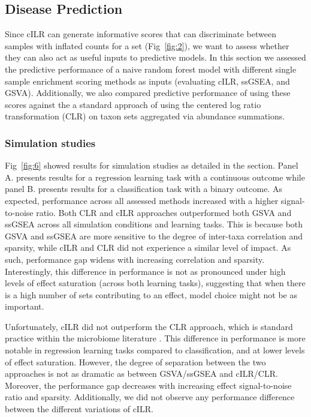 \documentclass[10pt,letterpaper]{article}
\begin{document}
\subsection*{Disease Prediction}   
Since cILR can generate informative scores that can discriminate between samples with inflated counts for a set (Fig~\ref{fig:2}), we want to assess whether they can also act as useful inputs to predictive models. In this section we assessed the predictive performance of a naive random forest model \cite{breiman2001} with different single sample enrichment scoring methods as inputs (evaluating cILR, ssGSEA, and GSVA). Additionally, we also compared predictive performance of using these scores against the a standard approach of using the centered log ratio transformation (CLR) on taxon sets aggregated via abundance summations.     

\subsubsection*{Simulation studies}
Fig~\ref{fig:6} showed results for simulation studies as detailed in the  section. Panel A. presents results for a regression learning task with a continuous outcome while panel B. presents results for a classification task with a binary outcome. As expected, performance across all assessed methods increased with a higher signal-to-noise ratio. Both CLR and cILR approaches outperformed both GSVA and ssGSEA across all simulation conditions and learning tasks. This is because both GSVA and ssGSEA are more sensitive to the degree of inter-taxa correlation and sparsity, while cILR and CLR did not experience a similar level of impact. As such, performance gap widens with increasing correlation and sparsity. Interestingly, this difference in performance is not as pronounced under high levels of effect saturation (across both learning tasks), suggesting that when there is a high number of sets contributing to an effect, model choice might not be as important.   

Unfortunately, cILR did not outperform the CLR approach, which is standard practice within the microbiome literature \cite{gloor2017}. This difference in performance is more notable in regression learning tasks compared to classification, and at lower levels of effect saturation. However, the degree of separation between the two approaches is not as dramatic as between GSVA/ssGSEA and cILR/CLR. Moreover, the performance gap decreases with increasing effect signal-to-noise ratio and sparsity. Additionally, we did not observe any performance difference between the different variations of cILR. 
\end{document}
